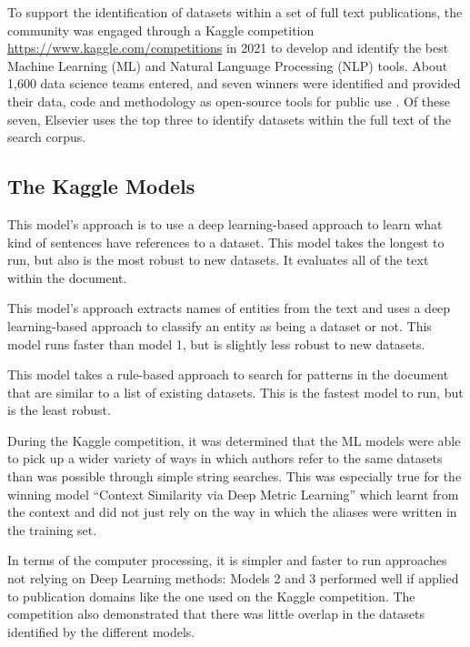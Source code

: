 \documentclass[titlepage, 11pt]{article}
\begin{document}
{To support the identification of datasets within a set of full text publications, the community was engaged through a Kaggle competition \url{https://www.kaggle.com/competitions} in 2021 to develop and identify the best Machine Learning (ML) and Natural Language Processing (NLP) tools. About 1,600 data science teams entered, and seven winners were identified and provided their data, code and methodology as open-source tools for public use\cite{source2,kaggle,ghani,source7} . Of these seven, Elsevier uses the top three to identify datasets within the full text of the search corpus. 

\subsection{The Kaggle Models}
\begin{description}[style=nextline]
\item [Model 1 (Deep Learning - Sentence Context)]
This model’s approach is to use a deep learning-based approach to learn what kind of sentences have references to a dataset. This model takes the longest to run, but also is the most robust to new datasets. It evaluates all of the text within the document.

\item [Model 2 (Deep Learning - Entity names)]
This model’s approach extracts names of entities from the text and uses a deep learning-based approach to classify an entity as being a dataset or not. This model runs faster than model 1, but is slightly less robust to new datasets.

\item [Model 3 (Pattern Marching)]
This model takes a rule-based approach to search for patterns in the document that are similar to a list of existing datasets. This is the fastest model to run, but is the least robust.

\end{description}

During the Kaggle competition, it was determined that the ML models were able to pick up a wider variety of ways in which authors refer to the same datasets than was possible through simple string searches. This was especially true for the winning model “Context Similarity via Deep Metric Learning” which learnt from the context and did not just rely on the way in which the aliases were written in the training set. 

In terms of the computer processing, it is simpler and faster to run approaches not relying on Deep Learning methods: Models 2 and 3 performed well if applied to publication domains like the one used on the Kaggle competition. The competition also demonstrated that there was little overlap in the datasets identified by the different models. 

}
\end{document}
